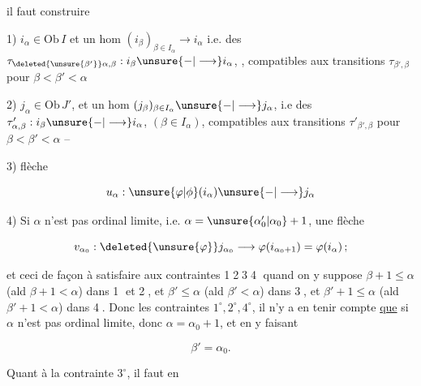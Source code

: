 
il faut construire

1) $i_\alpha\in\mathrm{Ob}\,I$ et un hom $(i_\beta)_{\beta\in I_\alpha}\longrightarrow i_\alpha$ i.e. des $\tau_{\deleted{\unsure{\beta'}}\alpha,\beta}:i_\beta\unsure{-|\longrightarrow}i_\alpha$, , compatibles aux transitions $\tau_{\beta',\beta}$ pour $\beta<\beta'<\alpha$

2) $j_\alpha\in\mathrm{Ob}\,J'$, et un hom $(j_\beta)_{\beta\in I_\alpha}\unsure{-|\longrightarrow}j_\alpha$, i.e des $\tau'_{\alpha,\beta}:i_\beta\unsure{-|\longrightarrow}i_\alpha$, $(\beta\in I_\alpha)$, compatibles aux transitions $\tau'_{\beta',\beta}$ pour $\beta<\beta'<\alpha$ --

3)  flèche

\[
u_\alpha:\unsure{\varphi|\phi}(i_\alpha)\unsure{-|\longrightarrow}j_\alpha
\]

4) Si $\alpha$ n'est pas ordinal limite, i.e. $\alpha=\unsure{\alpha'_0|\alpha_0}+1$, une flèche

\[
v_{\alpha_0}:\deleted{\unsure{\varphi}}j_{\alpha_0}\longrightarrow\varphi(i_{\alpha_0+1})=\varphi(i_\alpha)\,;
\]

 et ceci de façon à satisfaire aux contraintes \textcircled{1}\textcircled{2}\textcircled{3}\textcircled{4} quand on y suppose $\beta+1\leq\alpha$ (ald $\beta+1<\alpha$) dans \textcircled{1} et \textcircled{2}, et $\beta'\leq\alpha$ (ald $\beta'<\alpha$) dans \textcircled{3}, et $\beta'+1\leq\alpha$ (ald $\beta'+1<\alpha$) dans \textcircled{4}. Donc  les contraintes $1^\circ,2^\circ,4^\circ$,  il n'y a en tenir compte \uline{que} si $\alpha$ n'est pas ordinal limite, donc $\alpha=\alpha_0+1$, et en y faisant

\[
\beta'=\alpha_0.
\]

Quant à la contrainte $3^\circ$, il faut en

